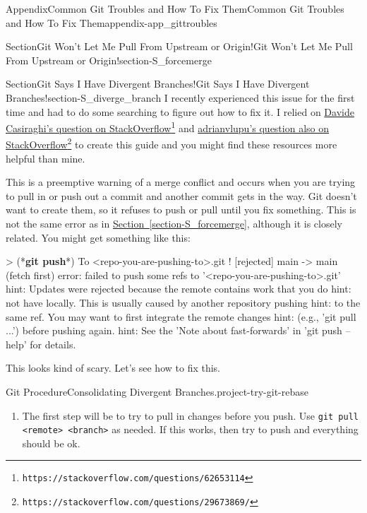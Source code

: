 \documentclass[oneside,10pt,]{book}
\newcommand{\xreffont}{\relax}
\newcommand{\mono}[1]{\texttt{#1}}
\newcommand{\consoleinput}[1]{\textbf{#1}}
\begin{document}
\begin{appendixptx}{Appendix}{Common Git Troubles and How To Fix Them}{}{Common Git Troubles and How To Fix Them}{}{}{appendix-app_gittroubles}
\begin{sectionptx}{Section}{Git Won't Let Me Pull From Upstream or Origin!}{}{Git Won't Let Me Pull From Upstream or Origin!}{}{}{section-S_forcemerge}
\end{sectionptx}
%
%
\typeout{************************************************}
\typeout{************************************************}
%
\begin{sectionptx}{Section}{Git Says I Have Divergent Branches!}{}{Git Says I Have Divergent Branches!}{}{}{section-S_diverge_branch}
I recently experienced this issue for the first time and had to do some searching to figure out how to fix it. I relied on \href{https://stackoverflow.com/questions/62653114}{Davide Casiraghi's question on StackOverflow}\footnote{\nolinkurl{https://stackoverflow.com/questions/62653114}\label{fn-S_diverge_branch-b-b}} and \href{https://stackoverflow.com/questions/29673869/}{adrianvlupu's question also on StackOverflow}\footnote{\nolinkurl{https://stackoverflow.com/questions/29673869/}\label{fn-S_diverge_branch-b-d}} to create this guide and you might find these resources more helpful than mine.%
\par
This is a preemptive warning of a merge conflict and occurs when you are trying to pull in or push out a commit and another commit gets in the way. Git doesn't want to create them, so it refuses to push or pull until you fix something. This is not the same error as in \hyperref[section-S_forcemerge]{Section~{\xreffont\ref{section-S_forcemerge}}}, although it is closely related. You might get something like this:%
\begin{console}{0}{1}{0}
> (*\consoleinput{git push}*)
To <repo-you-are-pushing-to>.git
 ! [rejected]        main -> main (fetch first)
error: failed to push some refs to '<repo-you-are-pushing-to>.git'
hint: Updates were rejected because the remote contains work that you do
hint: not have locally. This is usually caused by another repository pushing
hint: to the same ref. You may want to first integrate the remote changes
hint: (e.g., 'git pull ...') before pushing again.
hint: See the 'Note about fast-forwards' in 'git push --help' for details.
\end{console}
This looks kind of scary. Let's see how to fix this.%
\begin{project}{Git Procedure}{Consolidating Divergent Branches.}{project-try-git-rebase}%
\begin{enumerate}[font=\bfseries,label=(\alph*),ref=\alph*]%
\item{}The first step will be to try to pull in changes before you push. Use \mono{git pull <remote> <branch>} as needed. If this works, then try to push and everything should be ok.%

\end{enumerate}
\end{project}
\end{sectionptx}
\end{appendixptx}
\end{document}
